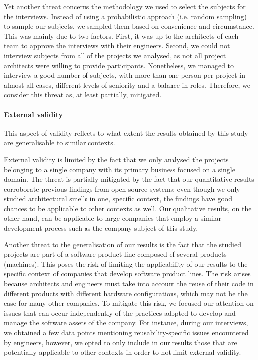Yet another threat concerns the methodology we used to select the subjects for the interviews. Instead of using a probabilistic approach (i.e. random sampling) to sample our subjects, we sampled them based on convenience and circumstance. 
This was mainly due to two factors. First, it was up to the architects of each team to approve the interviews with their engineers.
Second, we could not interview subjects from all of the projects we analysed, as not all project architects were willing to provide participants.
Nonetheless, we managed to interview a good number of subjects, with more than one person per project in almost all cases, different levels of seniority and a balance in roles. Therefore, we consider this threat as, at least partially, mitigated.

\paragraph{External validity}
This aspect of validity reflects to what extent the results obtained by this study are generalisable to similar contexts.

External validity is limited by the fact that we only analysed the projects belonging to a single company with its primary business focused on a single domain.
The threat is partially mitigated by the fact that our quantitative results corroborate previous findings from open source systems: even though we only studied architectural smells in one, specific context, the findings have good chances to be applicable to other contexts as well.
Our qualitative results, on the other hand, can be applicable to large companies that employ a similar development process such as the company subject of this study.

Another threat to the generalisation of our results is the fact that the studied projects are part of a software product line composed of several products (machines).
This poses the risk of limiting the applicability of our results to the specific context of companies that develop software product lines.
The risk arises because architects and engineers must take into account the reuse of their code in different products with different hardware configurations, which may not be the case for many other companies.
To mitigate this risk, we focused our attention on issues that can occur independently of the practices adopted to develop and manage the software assets of the company.
For instance, during our interviews, we obtained a few data points mentioning reusability-specific issues encountered by engineers, however, we opted to only include in our results those that are potentially applicable to other contexts in order to not limit external validity.

